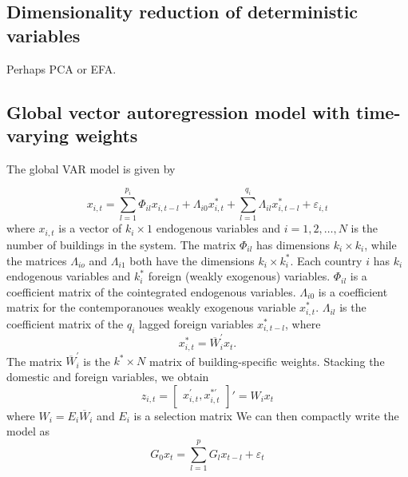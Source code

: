 \documentclass[preprint, 11pt]{elsarticle}
\newcommand{\?}{\stackrel{?}{=}}
\newcommand{\ol}{\overline}
\begin{document}

\subsection{Dimensionality reduction of deterministic variables}
Perhaps PCA or EFA.

\subsection{Global vector autoregression model with time-varying weights}
The global VAR model \cite{dees2007exploring} is given by

\begin{equation}
  \label{eq:1}
  x_{i,t} = \sum_{l=1}^{p_{i}}\Phi_{il}x_{i,t-l} + \Lambda_{i0}x_{i,t}^{*} + \sum_{l=1}^{q_{i}}\Lambda_{il}x_{i,t-l}^{*} + \varepsilon_{i,t}
\end{equation}
where $x_{i,t}$ is a vector of $k_{i}\times 1$ endogenous variables and $i = 1, 2, \ldots, N$ is the number of buildings
in the system.  The matrix $\Phi_{il}$ has dimensions $k_{i}\times k_{i}$, while the matrices $\Lambda_{io}$ and
$\Lambda_{i1}$ both have the dimensions $k_{i}\times k_{i}^{*}$.
Each country $i$ has $k_{i}$ endogenous variables and $k_{i}^{*}$ foreign (weakly exogenous) variables.
$\Phi_{il}$ is a coefficient matrix of the cointegrated
endogenous variables. $\Lambda_{i0}$ is a coefficient matrix for the contemporanoues weakly exogenous variable
$x_{i,t}^{*}$. $\Lambda_{il}$ is the coefficient matrix of the $q_{i}$ lagged foreign variables $x_{i,t-l}^{*}$, where
\begin{equation}
  \label{eq:2}
  x_{i,t}^{*} = \ol{W}_{i}^{'}x_{t}.
\end{equation}
The matrix $\ol{W}_{i}^{'}$ is the $k^{*} \times N$ matrix of building-specific weights.
Stacking the domestic and foreign variables, we obtain
\begin{equation}
  \label{eq:3}
  z_{i,t} =
  \begin{bmatrix}
    x_{i,t}^{'}, x_{i,t}^{*'}
  \end{bmatrix}'  = W_{i}x_{t}
\end{equation}
where $W_{i} = E_{i}\ol{W}_{i}$ and $E_{i}$ is a selection matrix We
can then compactly write the model as
\begin{equation}
  \label{eq:4}
  G_{0}x_{t} = \sum_{l=1}^{p}G_{l}x_{t-l} + \varepsilon_{t}
\end{equation}
\end{document}
